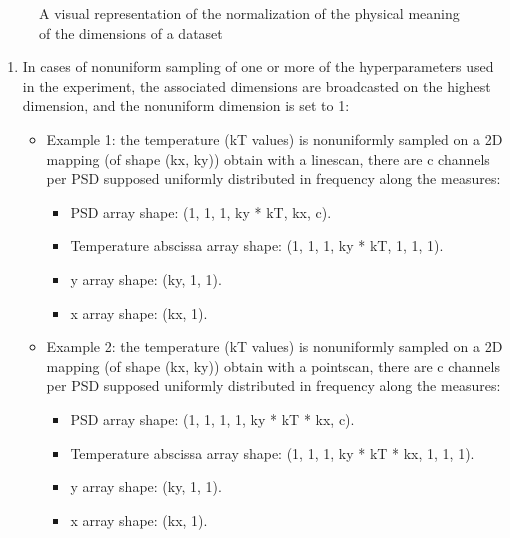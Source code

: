 \documentclass[letterpaper,10pt,english]{sphinxmanual}
\begin{document}
\begin{figure}[htbp]
\centering
\capstart

\noindent{}
\caption{A visual representation of the normalization of the physical meaning of the dimensions of a dataset}\label{\detokenize{source/normalization:id4}}\label{\detokenize{source/normalization:dataset-dimension-norm}}\end{figure}
\begin{enumerate}
%
\setcounter{enumi}{2}
\item {} 
\sphinxAtStartPar
In cases of non\sphinxhyphen{}uniform sampling of one or more of the hyperparameters used in the experiment, the associated dimensions are broadcasted on the highest dimension, and the non\sphinxhyphen{}uniform dimension is set to 1:
\begin{itemize}
\item {} 
\sphinxAtStartPar
Example 1: the temperature (kT values) is non\sphinxhyphen{}uniformly sampled on a 2D mapping (of shape (kx, ky)) obtain with a line\sphinxhyphen{}scan, there are c channels per PSD supposed uniformly distributed in frequency along the measures:
\begin{itemize}
\item {} 
\sphinxAtStartPar
PSD array shape: (1, 1, 1, ky * kT, kx, c).

\item {} 
\sphinxAtStartPar
Temperature abscissa array shape: (1, 1, 1, ky * kT, 1, 1, 1).

\item {} 
\sphinxAtStartPar
y array shape: (ky, 1, 1).

\item {} 
\sphinxAtStartPar
x array shape: (kx, 1).

\end{itemize}

\item {} 
\sphinxAtStartPar
Example 2: the temperature (kT values) is non\sphinxhyphen{}uniformly sampled on a 2D mapping (of shape (kx, ky)) obtain with a point\sphinxhyphen{}scan, there are c channels per PSD supposed uniformly distributed in frequency along the measures:
\begin{itemize}
\item {} 
\sphinxAtStartPar
PSD array shape: (1, 1, 1, 1, ky * kT * kx, c).

\item {} 
\sphinxAtStartPar
Temperature abscissa array shape: (1, 1, 1, ky * kT * kx, 1, 1, 1).

\item {} 
\sphinxAtStartPar
y array shape: (ky, 1, 1).

\item {} 
\sphinxAtStartPar
x array shape: (kx, 1).

\end{itemize}

\end{itemize}

\end{enumerate}
\end{document}
